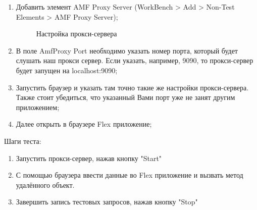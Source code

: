 \begin{enumerate}
\item Добавить элемент AMF Proxy Server (WorkBench > Add > Non-Test Elements > AMF Proxy Server);

\begin{figure}[ht]
\caption{Настройка прокси-сервера}
\label{ris:proxySettings.png}
\end{figure}

\item В поле AmfProxy Port необходимо указать номер порта, который будет слушать наш прокси сервер.
Если указать, например, 9090, то прокси-сервер будет запущен на localhost:9090;
\item Запустить браузер и указать там точно такие же настройки прокси-сервера.
Также стоит убедиться, что указанный Вами порт уже не занят другим приложением;
\item Далее открыть в браузере Flex приложение;
\end{enumerate}

Шаги теста:

\begin{enumerate}
\item Запустить прокси-сервер, нажав кнопку "Start"
\item С помощью браузера ввести данные во Flex приложение и вызвать метод удалённого объект.
\item Завершить запись тестовых запросов, нажав кнопку "Stop"
\end{enumerate}

